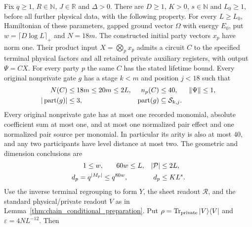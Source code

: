\begin{lemma}
    \label{thm:chain_physical_preparation}
    \leanok
    Fix $q\ge1$, $R\in\mathbb N$, $J\in\mathbb R$ and $\Delta>0$.
    There are $D\ge1$, $K>0$, $s\in\mathbb N$ and $L_0\ge1$,
    before all further physical data, with the following property.
    For every $L\ge L_0$, Hamiltonian of these parameters, gapped
    ground vector $\Omega$ with energy $E_0$,
    put $w=\lceil D\log L\rceil_+$ and $N=18m$.
    The constructed initial party vectors $x_p$ have norm one.
    Their product input $X=\bigotimes_p x_p$ admits a circuit $C$
    to the specified terminal physical factors and all retained
    private auxiliary registers, with output $\Psi=CX$.
    For every party $p$ the same $C$ has the stated lifetime bound.
    Every original nonprivate gate $g$ has a stage $k<m$ and position
    $j<18$ such that
    \begin{align}
        N(C)                     & \le18m\le20m\le2L,         & n_p(C) & \le40, & \|\Psi\| & \le1,\notag \\
        |\operatorname{part}(g)| & \le3,                      &
        \operatorname{part}(g)   & \subseteq\mathcal S_{k,j}.
        \label{eq:chain_physical_resources}
    \end{align}
    Every original nonprivate gate has at most one recorded monomial,
    absolute coefficient sum at most one, and at most one normalized
    pair effect and one normalized pair source per monomial.
    In particular its arity is also at most $40$, and any two
    participants have level distance at most two.
    The geometric and dimension conclusions are
    \begin{align}
        1\le w,       & \qquad 60w\le L, & |\mathcal P| & \le2L,\notag \\
        d_p=q^{|M_p|} & \le q^{80w},     & d_p          & \le KL^s.
        \label{eq:chain_physical_dimensions}
    \end{align}
    Use the inverse terminal regrouping to form $Y$, the
    sheet readout $\mathcal R$, and the standard physical/private
    readout $V$ as in Lemma~\ref{thm:chain_conditional_preparation}.
    Put $\rho=\operatorname{Tr}_{\rm private}|V\rangle\langle V|$
    and $\varepsilon=4NL^{-12}$. Then
    \begin{align}

\end{align}
\end{lemma}
